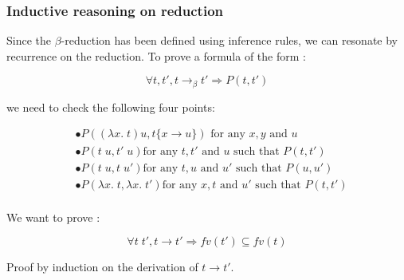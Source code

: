 \documentclass{article}
\theoremstyle{plain}
\theoremstyle{plain}
\begin{document}
  \subsubsection{Inductive reasoning on reduction}

    Since the $\beta$-reduction has been defined using inference rules, we can
    resonate by recurrence on the reduction. To prove a formula of the form :

    \[
      \forall t, t', t \to_\beta t' \Rightarrow P(t, t')
    \]

    we need to check the following four points:

    \begin{align*}
      &\bullet P((\lambda x.\;t)u, t\{x\rightarrow u\}) \text{ for any } x, y \text{ and
      } u \\
      &\bullet P(t\;u, t'\;u) \text{for any } t, t' \text{ and } u \text{ such that }
      P(t, t') \\
      &\bullet P(t\;u, t\;u') \text{for any } t, u \text{ and } u' \text{ such that }
      P(u, u') \\
      &\bullet P(\lambda x.\;t, \lambda x.\;t') \text{for any } x, t \text{ and } u' \text{ such that }
      P(t, t') \\
    \end{align*}

  \exam We want to prove :

    \[\forall t\;t', t \to t' \Rightarrow fv(t') \subseteq fv(t)\]

  Proof by induction on the derivation of $t \to t'$.
\end{document}
